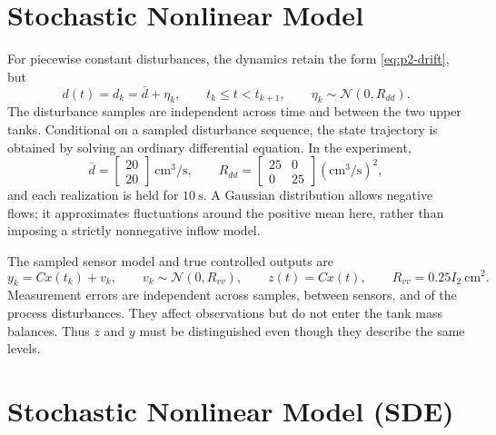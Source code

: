 \section{Stochastic Nonlinear Model}

For piecewise constant disturbances, the dynamics retain the form
\eqref{eq:p2-drift}, but
\begin{equation}
 d(t)=d_k=\bar d+\eta_k,\qquad t_k\leq t<t_{k+1},\qquad
 \eta_k\sim\mathcal N(0,R_{dd}).
\end{equation}
The disturbance samples are independent across time and between the two
upper tanks. Conditional on a sampled disturbance sequence, the state
trajectory is obtained by solving an ordinary differential equation.
In the experiment,
\begin{equation}
 \bar d=\begin{bmatrix}20\\20\end{bmatrix}\ \mathrm{cm^3/s},\qquad
 R_{dd}=\begin{bmatrix}25&0\\0&25\end{bmatrix}(\mathrm{cm^3/s})^2,
\end{equation}
and each realization is held for $10\ \mathrm{s}$. A Gaussian distribution
allows negative flows; it approximates fluctuations around the positive
mean here, rather than imposing a strictly nonnegative inflow model.

The sampled sensor model and true controlled outputs are
\begin{equation}
 y_k=Cx(t_k)+v_k,\qquad v_k\sim\mathcal N(0,R_{vv}),\qquad
 z(t)=Cx(t),\qquad R_{vv}=0.25I_2\ \mathrm{cm^2}.
 \label{eq:p2-noisy-sensor}
\end{equation}
Measurement errors are independent across samples, between sensors, and
of the process disturbances. They affect observations but do not enter
the tank mass balances. Thus $z$ and $y$ must be distinguished even though
they describe the same levels.

\section{Stochastic Nonlinear Model (SDE)}


